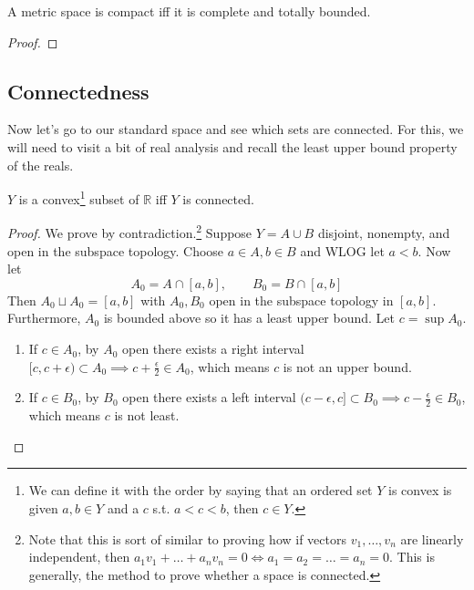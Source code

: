   \begin{theorem}
    A metric space is compact iff it is complete and totally bounded. 
  \end{theorem}
  \begin{proof}
    
  \end{proof}

\subsection{Connectedness} 

  Now let's go to our standard space and see which sets are connected. For this, we will need to visit a bit of real analysis and recall the least upper bound property of the reals.  

  \begin{theorem}
    $Y$ is a convex\footnote{We can define it with the order by saying that an ordered set $Y$ is convex is given $a, b \in Y$ and a $c$ s.t. $a < c < b$, then $c \in Y$.} subset of $\mathbb{R}$ iff $Y$ is connected. 
  \end{theorem}
  \begin{proof}
    We prove by contradiction.\footnote{Note that this is sort of similar to proving how if vectors $v_1, \ldots, v_n$ are linearly independent, then $a_1 v_1 + \ldots + a_n v_n = 0 \iff a_1 = a_2 = \ldots = a_n = 0$. This is generally, the method to prove whether a space is connected.} Suppose $Y = A \cup B$ disjoint, nonempty, and open in the subspace topology. Choose $a \in A, b \in B$ and WLOG let $a < b$. Now let 
    \begin{equation}
      A_0 = A \cap [a, b], \qquad B_0 = B \cap [a, b]
    \end{equation}
    Then $A_0 \sqcup A_0 = [a, b]$ with $A_0, B_0$ open in the subspace topology in $[a, b]$. Furthermore, $A_0$ is bounded above so it has a least upper bound. Let $c = \sup{A_0}$. 
    \begin{enumerate}
      \item If $c \in A_0$, by $A_0$ open there exists a right interval $[c, c + \epsilon) \subset A_0 \implies c + \frac{\epsilon}{2} \in A_0$, which means $c$ is not an upper bound. 
      \item If $c \in B_0$, by $B_0$ open there exists a left interval $(c - \epsilon, c] \subset B_0 \implies c - \frac{\epsilon}{2} \in B_0 $, which means $c$ is not least. 
    \end{enumerate}
  \end{proof}

